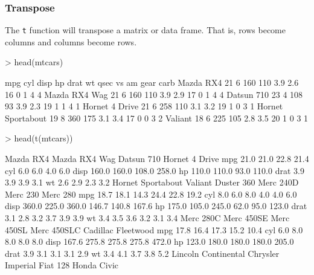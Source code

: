 \documentclass[10pt,slidestop,mathserif,c]{beamer}
\begin{document}
\begin{frame}
	\frametitle{Transpose}
	The \texttt{t} function will transpose a matrix or data frame. That is, rows become columns and columns become rows.
	
\begin{Schunk}
\begin{Sinput}
> head(mtcars)
\end{Sinput}
\begin{Soutput}
                  mpg cyl disp  hp drat  wt qsec vs am gear carb
Mazda RX4          21   6  160 110  3.9 2.6   16  0  1    4    4
Mazda RX4 Wag      21   6  160 110  3.9 2.9   17  0  1    4    4
Datsun 710         23   4  108  93  3.9 2.3   19  1  1    4    1
Hornet 4 Drive     21   6  258 110  3.1 3.2   19  1  0    3    1
Hornet Sportabout  19   8  360 175  3.1 3.4   17  0  0    3    2
Valiant            18   6  225 105  2.8 3.5   20  1  0    3    1
\end{Soutput}
\begin{Sinput}
> head(t(mtcars))
\end{Sinput}
\begin{Soutput}
     Mazda RX4 Mazda RX4 Wag Datsun 710 Hornet 4 Drive
mpg       21.0          21.0       22.8           21.4
cyl        6.0           6.0        4.0            6.0
disp     160.0         160.0      108.0          258.0
hp       110.0         110.0       93.0          110.0
drat       3.9           3.9        3.9            3.1
wt         2.6           2.9        2.3            3.2
     Hornet Sportabout Valiant Duster 360 Merc 240D Merc 230 Merc 280
mpg               18.7    18.1       14.3      24.4     22.8     19.2
cyl                8.0     6.0        8.0       4.0      4.0      6.0
disp             360.0   225.0      360.0     146.7    140.8    167.6
hp               175.0   105.0      245.0      62.0     95.0    123.0
drat               3.1     2.8        3.2       3.7      3.9      3.9
wt                 3.4     3.5        3.6       3.2      3.1      3.4
     Merc 280C Merc 450SE Merc 450SL Merc 450SLC Cadillac Fleetwood
mpg       17.8       16.4       17.3        15.2               10.4
cyl        6.0        8.0        8.0         8.0                8.0
disp     167.6      275.8      275.8       275.8              472.0
hp       123.0      180.0      180.0       180.0              205.0
drat       3.9        3.1        3.1         3.1                2.9
wt         3.4        4.1        3.7         3.8                5.2
     Lincoln Continental Chrysler Imperial Fiat 128 Honda Civic

\end{Soutput}
\end{Schunk}
\end{frame}
\end{document}

